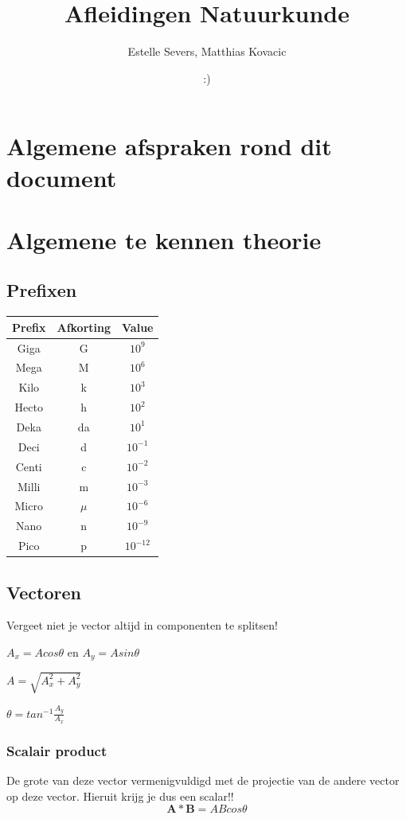 \documentclass[12pt,a4paper]{article}
\author{Estelle Severs, Matthias Kovacic}
\title{Afleidingen Natuurkunde}
\date{:)}
\begin{document}
	\maketitle
	\tableofcontents
	\newpage
	\section{Algemene afspraken rond dit document}
	\section{Algemene te kennen theorie}
	\subsection{Prefixen}
		\begin{center}
		\begin{tabular}{ | c | c | c | }
		\hline
			 Prefix & Afkorting & Value \\ 
		\hline
			Giga & G & $10^{9}$ \\ 
			Mega & M & $10^{6}$ \\  
 			Kilo & k & $10^{3}$ \\   
 			Hecto & h & $10^{2}$ \\   
 			Deka & da & $10^{1}$ \\   
 			Deci & d & $10^{-1}$ \\   
 			Centi & c & $10^{-2}$ \\   
 			Milli & m & $10^{-3}$ \\   
 			Micro & $\mu$ & $10^{-6}$ \\   
 			Nano & n & $10^{-9}$ \\   
 			Pico & p & $10^{-12}$ \\   
 		\hline
		\end{tabular}
		\end{center}
	\subsection{Vectoren}
	Vergeet niet je vector altijd in componenten te splitsen!
	
	\(A_x = Acos\theta\) en \(A_y = Asin\theta\)
	
	\(A = \sqrt{A_x^2 + A_y^2}\)
	
	\(\theta = tan^{-1}\frac{A_y}{A_x}\)
	\subsubsection{Scalair product}
	De grote van deze vector vermenigvuldigd met de projectie van de andere vector op deze vector. Hieruit krijg je dus een scalar!!
	\[\textbf{A} * \textbf{B} = ABcos\theta\]
\end{document}
